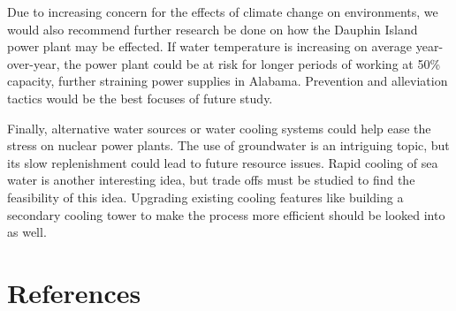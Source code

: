 \documentclass[
  letterpaper,
  DIV=11,
  numbers=noendperiod]{scrreprt}
\begin{document}
Due to increasing concern for the effects of climate change on
environments, we would also recommend further research be done on how
the Dauphin Island power plant may be effected. If water temperature is
increasing on average year-over-year, the power plant could be at risk
for longer periods of working at 50\% capacity, further straining power
supplies in Alabama. Prevention and alleviation tactics would be the
best focuses of future study.

Finally, alternative water sources or water cooling systems could help
ease the stress on nuclear power plants. The use of groundwater is an
intriguing topic, but its slow replenishment could lead to future
resource issues. Rapid cooling of sea water is another interesting idea,
but trade offs must be studied to find the feasibility of this idea.
Upgrading existing cooling features like building a secondary cooling
tower to make the process more efficient should be looked into as well.


\chapter*{References}\label{references}

\end{document}
